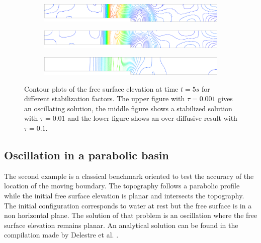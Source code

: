 \documentclass[a4paper,12pt]{article}
\begin{document}
\begin{figure}[H]
\begin{subfigure}{\textwidth}
    \includegraphics[width=\textwidth]{img/step/stab_0.001_time_5.pdf}
\end{subfigure}
\par\medskip
\begin{subfigure}{\textwidth}
    \includegraphics[width=\textwidth]{img/step/stab_0.01_time_5.pdf}
\end{subfigure}
\par\medskip
\begin{subfigure}{\textwidth}
    \includegraphics[width=\textwidth]{img/step/stab_0.1_time_5.pdf}
\end{subfigure}
\caption{Contour plots of the free surface elevation at time $t=5s$ for different stabilization factors. The upper figure with $\tau=0.001$ gives an oscillating solution, the middle figure shows a stabilized solution with $\tau=0.01$ and the lower figure shows an over diffusive result with $\tau=0.1$.}
\label{stab_parameters_time2}
\end{figure}


\subsection{Oscillation in a parabolic basin}

The second example is a classical benchmark oriented to test the accuracy of the location of the moving boundary. The topography follows a parabolic profile while the initial free surface elevation is planar and intersects the topography. The initial configuration corresponds to water at rest but the free surface is in a non horizontal plane. The solution of that problem is an oscillation where the free surface elevation remains planar. An analytical solution can be found in the compilation made by Delestre et al. \cite{delestre2013}.
\end{document}

